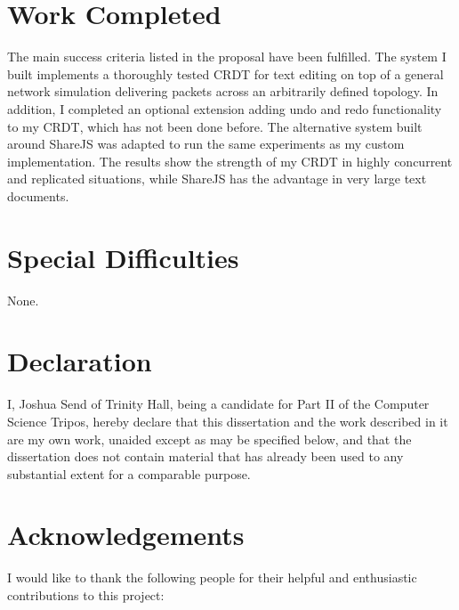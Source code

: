 \documentclass[12pt,a4paper,twoside,openright]{report}
\begin{document}
\section*{Work Completed}

The main success criteria listed in the proposal have been fulfilled. The system I built implements a thoroughly tested CRDT for text editing on top of a general network simulation delivering packets across an arbitrarily defined topology. In addition, I completed an optional extension adding undo and redo functionality to my CRDT, which has not been done before. The alternative system built around ShareJS was adapted to run the same experiments as my custom implementation. The results show the strength of my CRDT in highly concurrent and replicated situations, while ShareJS has the advantage in very large text documents.

\section*{Special Difficulties}

None.
 
\newpage
\section*{Declaration}

I, Joshua Send of Trinity Hall, being a candidate for Part II of the Computer
Science Tripos, hereby declare that this dissertation and the work described in it are my own work,
unaided except as may be specified below, and that the dissertation
does not contain material that has already been used to any substantial
extent for a comparable purpose.

\bigskip
{}

\medskip
{}

\tableofcontents

\listoffigures

\listoftables

\newpage
\section*{Acknowledgements}

I would like to thank the following people for their helpful and enthusiastic contributions to this project:
\end{document}
